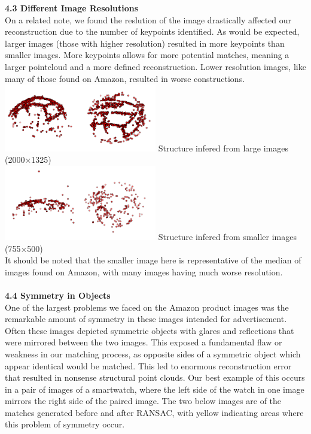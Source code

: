 \documentclass[12pt]{article}
\begin{document}
\begin{multicols}{2}
{\large \textbf{4.3 Different Image Resolutions}}\\
On a related note, we found the reslution of the image drastically affected our reconstruction due to the number of keypoints identified. As would be expected, larger images (those with higher resolution) resulted in more keypoints than smaller images. More keypoints allows for more potential matches, meaning a larger pointcloud and a more defined reconstruction. Lower resolution images, like many of those found on Amazon,  resulted in worse constructions. 
\includegraphics[width=0.5\textwidth]{images/VBallMediumSurf_SideBySide.png}
Structure infered from large images (2000$\times$1325) \\
\includegraphics[width=0.5\textwidth]{images/VBallSmallSurf_SideBySide.png}
Structure infered from smaller images (755$\times$500) \\
It should be noted that the smaller image here is representative of the median of images found on Amazon, with many images having much worse resolution. \\\\
{\large \textbf{4.4 Symmetry in Objects}}\\
One of the largest problems we faced on the Amazon product images was the remarkable amount of symmetry in these images intended for advertisement. Often these images depicted symmetric objects with glares and reflections that were mirrored between the two images. This exposed a fundamental flaw or weakness in our matching process, as opposite sides of a symmetric object which appear identical would be matched. This led to enormous reconstruction error that resulted in nonsense structural point clouds. Our best example of this occurs in a pair of images of a smartwatch, where the left side of the watch in one image mirrors the right side of the paired image. The two below images are of the matches generated before and after RANSAC, with yellow indicating areas where this problem of symmetry occur.\\\\

\end{multicols}
\end{document}
